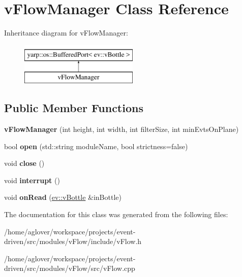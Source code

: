 \hypertarget{classvFlowManager}{}\section{v\+Flow\+Manager Class Reference}
\label{classvFlowManager}
Inheritance diagram for v\+Flow\+Manager\+:\begin{figure}[H]
\begin{center}
\leavevmode
\includegraphics[height=2.000000cm]{classvFlowManager}
\end{center}
\end{figure}
\subsection*{Public Member Functions}
\begin{DoxyCompactItemize}
\item 
{\bfseries v\+Flow\+Manager} (int height, int width, int filter\+Size, int min\+Evts\+On\+Plane)\hypertarget{classvFlowManager_a9d28c98ce6f6c0591a89f5055153e295}{}\label{classvFlowManager_a9d28c98ce6f6c0591a89f5055153e295}

\item 
bool {\bfseries open} (std\+::string module\+Name, bool strictness=false)\hypertarget{classvFlowManager_a2c299db37662565d5b0c59679b790a4b}{}\label{classvFlowManager_a2c299db37662565d5b0c59679b790a4b}

\item 
void {\bfseries close} ()\hypertarget{classvFlowManager_abcf434ef8391ec6741c0754bc4a88ab8}{}\label{classvFlowManager_abcf434ef8391ec6741c0754bc4a88ab8}

\item 
void {\bfseries interrupt} ()\hypertarget{classvFlowManager_a10d85ce69f60a672adba81aff4a046d8}{}\label{classvFlowManager_a10d85ce69f60a672adba81aff4a046d8}

\item 
void {\bfseries on\+Read} (\hyperlink{classev_1_1vBottle}{ev\+::v\+Bottle} \&in\+Bottle)\hypertarget{classvFlowManager_a9749ff591f71a96735692ce1520c9e30}{}\label{classvFlowManager_a9749ff591f71a96735692ce1520c9e30}

\end{DoxyCompactItemize}


The documentation for this class was generated from the following files\+:\begin{DoxyCompactItemize}
\item 
/home/aglover/workspace/projects/event-\/driven/src/modules/v\+Flow/include/v\+Flow.\+h\item 
/home/aglover/workspace/projects/event-\/driven/src/modules/v\+Flow/src/v\+Flow.\+cpp\end{DoxyCompactItemize}
